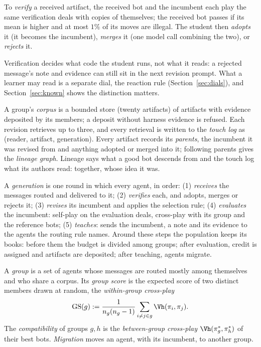\documentclass[11pt]{article}
\numberwithin{theorem}{section}
\theoremstyle{definition}
\begin{document}
\begin{definition}
To \emph{verify} a received artifact, the received bot and the incumbent each play the same verification deals with
copies of themselves; the received bot passes if its mean is higher and at most $1\%$ of its moves are illegal. The
student then \emph{adopts} it (it becomes the incumbent), \emph{merges} it (one model call combining the two), or
\emph{rejects} it.
\end{definition}

Verification decides what code the student runs, not what it reads: a rejected message's note and evidence can still
sit in the next revision prompt. What a learner may read is a separate dial, the reaction rule
(Section~\ref{sec:dials}), and Section~\ref{sec:known} shows the distinction matters.

\begin{definition}
A group's \emph{corpus} is a bounded store (twenty artifacts) of artifacts with evidence deposited by its members; a
deposit without harness evidence is refused. Each revision retrieves up to three, and every retrieval is written to the
\emph{touch log} as (reader, artifact, generation). Every artifact records its \emph{parents}, the incumbent it was
revised from and anything adopted or merged into it; following parents gives the \emph{lineage graph}. Lineage says
what a good bot descends from and the touch log what its authors read: together, whose idea it was.
\end{definition}

\begin{construction}[Generation]\label{con:gen}
A \emph{generation} is one round in which every agent, in order:
(1) \emph{receives} the messages routed and delivered to it;
(2) \emph{verifies} each, and adopts, merges or rejects it;
(3) \emph{revises} its incumbent and applies the selection rule;
(4) \emph{evaluates} the incumbent: self-play on the evaluation deals, cross-play with its group and the reference bots;
(5) \emph{teaches}: sends the incumbent, a note and its evidence to the agents the routing rule names.
Around these steps the population keeps its books: before them the budget is divided among groups; after evaluation,
credit is assigned and artifacts are deposited; after teaching, agents migrate.
\end{construction}

\begin{definition}
A \emph{group} is a set of agents whose messages are routed mostly among themselves and who share a corpus. Its
\emph{group score} is the expected score of two distinct members drawn at random, the \emph{within-group cross-play}
\[
\mathrm{GS}(g) := \frac{1}{n_g(n_g-1)}\sum_{i\neq j\in g}\Vh(\pi_i,\pi_j).
\]
The \emph{compatibility} of groups $g,h$
is the \emph{between-group cross-play} $\Vh(\pi^\ast_g,\pi^\ast_h)$ of their best bots. \emph{Migration} moves an agent,
with its incumbent, to another group.
\end{definition}
\end{document}
